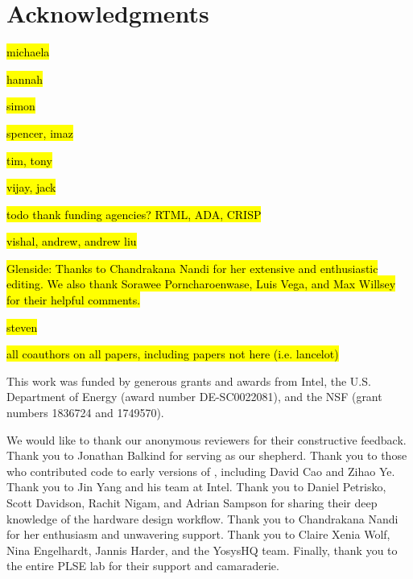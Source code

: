 \chapter*{Acknowledgments}

\hl{michaela}

\hl{hannah}

\hl{simon}

\hl{spencer, imaz}

\hl{tim, tony}

\hl{vijay, jack}

\hl{todo thank funding agencies?
RTML, ADA, CRISP}

\hl{vishal, andrew, andrew liu}

\hl{
Glenside:
Thanks to Chandrakana Nandi
  for her extensive and enthusiastic
  editing.
We also thank 
  Sorawee Porncharoenwase,
  Luis Vega, and
  Max Willsey
  for their helpful comments.
}

\hl{steven}

\hl{all coauthors on all papers, including papers not here (i.e. lancelot)}



This work was funded
  by generous grants
  and awards
  from
  Intel,
  the U.S. Department
  of Energy (award number DE-SC0022081),
  and the NSF (grant numbers 1836724 and 1749570).

We would like to thank
  our anonymous reviewers
  for their constructive feedback.
Thank you to
  Jonathan Balkind for serving
  as our shepherd.
Thank you to those who contributed code
  to early versions of \lr, including
  David Cao and Zihao Ye.
Thank you to Jin Yang and his
  team at Intel.
Thank you to 
  Daniel Petrisko, Scott Davidson,
  Rachit Nigam, and Adrian Sampson
  for sharing their deep knowledge of
  the hardware design workflow.
Thank you to Chandrakana Nandi
  for her enthusiasm and unwavering support.
Thank you to Claire Xenia Wolf, Nina Engelhardt,
  Jannis Harder,
  and the YosysHQ team.
Finally, thank you to the entire PLSE lab
  for their support and camaraderie.

  

\clearpage
